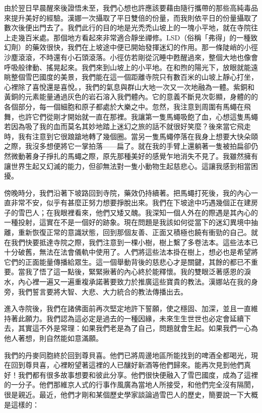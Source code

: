 由於翌日早晨醒來後證悟未至，我們心想也許應該要藉由隨行攜帶的那些高純毒品來提升美好的經驗。漢娜一次攝取了平日雙倍的份量，而我則依平日的份量攝取了數次後便出門去了。我們此行的目的地是光禿禿山坡上的一塊小平地，就在寺院往上走幾百米處。那個地方看起來非常適合靜坐禪修。LSD（俗稱「弗得」的一種致幻劑）的藥效很快，我們在上坡途中便已開始發揮迷幻的作用。那一條陡峭的小徑沙塵滾滾，不時還有小石頭滾落。小徑仿若剛從沉睡中甦醒過來，整個大地也像會呼吸般律動、搖晃起來。我們來到山坡上的小平地。在和煦的陽光下，放眼就能遠眺整個雪巴國度的美景，我們能在這一個距離寺院只有數百米的山坡上靜心打坐，心裡除了喜悅還是喜悅。，我們的氣息與群山大地一次又一次地融為一體。紫銅和黃銅的元素能量通過灰色的岩石溶入我們體內。它的意義不斷見次彰顯，身體的的各個部分，每一個細胞和原子都處於大樂之中。忽然，我注意到周圍有馬蠅在飛舞，也許它們從剛才開始就一直在那裡。我讓第一隻馬蠅吸飽了血，心想這隻馬蠅若因為吸了我的血而莫名其妙地踏上迷幻之旅的話不就很好笑麼？後來當它飛走時，我有注意到它很踉蹌地轉了幾個圈。當另一隻馬蠅停落在我身上想要大快朵頤之際，我沒多想便將它一掌拍落——扁了。就在我的手臂上還躺著一隻被拍扁卻仍然微動著身子掙扎的馬蠅之際，原先那種美好的感覺乍地消失不見了。我雖然擁有讓世界生起又幻滅的能力，但卻無法對一隻小動物生起慈悲心。這讓我感到相當困擾。

傍晚時分，我們沿著下坡路回到寺院，藥效仍持續著。把馬蠅打死後，我的內心一直非常不安，似乎有甚麼正努力想要掙脫出來。我們在下坡途中巧遇幾個正在建房子的雪巴人；在我眼裡看來，他們又矮又醜。我深知一個人外在的際遇是其內心的一種投射，這實在不是一個好的跡象。現在問題是我該如何從當下的迷幻異境中抽離，重新恢復正常的意識狀態，回到那個友善、正面又積極也饒有衝勁的自己。就在我們快要抵達寺院之際，我們注意到一棵小樹，樹上繫了多卷法本。這些法本已十分破舊，無法在法會儀軌中使用了。人們將這些法本掛在樹上，想必也是希望將它們的正面能量傳播給眾生。這一個舉動背後的慈悲心才是關鍵，其餘的都已不重要。當我了悟了這一點後，緊緊揪著的內心終於能釋懷。我的雙眼泛著感恩的淚水，內心裡一遍又一遍重複承諾著要致力於推廣這些寶貴的教法。漢娜站在我的身旁，我們誓言要將大智、大悲、大力統合的教法傳播出去。

進入寺院後，我們在諸佛面前再次堅定地許下誓願，使之穩固、加深，並且一直維持著此願力。我們認為這必定是過去的一種因緣，未來生生世世也必定會延續下去，其實這不外是常理：如果我們老是為了自己，問題就會生起。如果我們一心為他人著想，則自然能如意滿願。

我們的丹麥同胞終於回到尊貝喜。他們已將周邊地區所能找到的啤酒全都喝光，現在回到尊貝喜，心裡盼望著這裡的人已釀好新酒等他們歸來。能再次見到他們真好！我們都有很多故事想要和彼此分享。他們很快便融入了雪巴國度，成為了這裡的一分子。他們那維京人式的行事作風廣為當地人所接受，和他們完全沒有隔閡，很是親近。最近，他們才剛和某個歷史學家談論過雪巴人的歷史，簡要說一下大概是這樣的：

